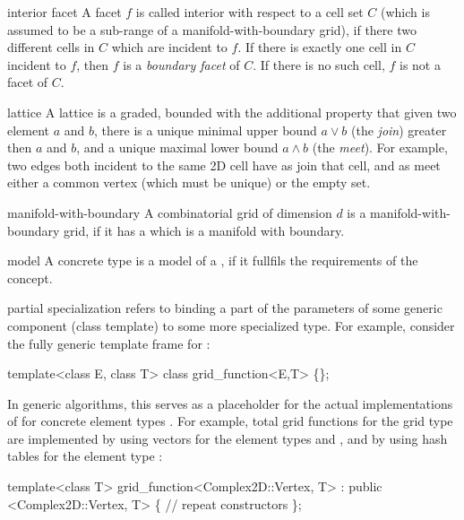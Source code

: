 \begin{Glossar}
\item[interior facet] A facet $f$ is called interior with respect to a cell set 
  $C$ (which is assumed to be a sub-range of a manifold-with-boundary grid),
  if there two different cells in $C$ which are incident to $f$.
  If there is exactly one cell in $C$ incident to $f$, then $f$ is a
  {\sl boundary facet\/} of $C$. If there is no such cell, $f$ is not a facet 
  of $C$.


\item[lattice]
  A lattice is a graded, bounded 
  with the additional property that given two element $a$ and $b$,
  there is a unique minimal upper bound $a \vee b$ (the {\sl join\/})
  greater then $a$ and $b$,
  and a unique maximal lower bound $a \wedge b$ (the {\sl meet\/}).
  For example, two edges both incident to the same 2D cell have
  as join that cell, and as meet either a common vertex (which must be unique)
  or the empty set.

\item[manifold-with-boundary]
  A combinatorial grid of dimension $d$ is a manifold-with-boundary grid,
  if it has a {\sl {}} which is a manifold with boundary.

\item[model]
  A concrete type is a model of a ,
  if it fullfils the requirements of the concept.

\item[partial specialization] refers to binding a part of the parameters 
  of some generic component (class template) to some more specialized type.
  For example, consider the fully generic template frame for 
  :
  \begin{example}
  template<class E, class T>
  class grid_function<E,T> \{\};
  \end{example}
  In generic algorithms, this serves as a placeholder for the actual implementations of 
   for concrete element  types .
  For example, total grid functions for the 
  grid type are implemented by using vectors for the element types 
  and , and by using hash tables for the element type :
  \begin{example}
  template<class T>
  grid_function<Complex2D::Vertex, T> 
    : public <Complex2D::Vertex, T> \{
    // repeat constructors
  \};


\end{example}
\end{Glossar}
